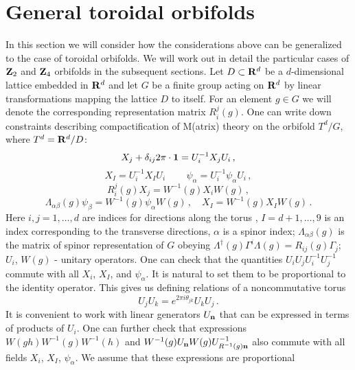 \documentclass[a4paper,a4paper]{article}
\begin{document}
\section{General toroidal orbifolds}
In this section we will consider  how the considerations above can be generalized to the case of  toroidal orbifolds. 
We will work out in detail the particular cases of ${\bf Z}_{2}$ and ${\bf Z}_{4}$ orbifolds in the subsequent sections. 
Let $D\subset {\bf R}^{d}$ be a $d$-dimensional lattice  embedded in ${\bf R}^{d}$ and let $G$ be a finite 
group acting on   ${\bf R}^{d}$ by linear transformations mapping the lattice $D$ to itself. 
For an element $g\in G$ we will denote the corresponding representation matrix $R_{i}^{j}(g)$.
One can write down constraints describing compactification of M(atrix) theory on the orbifold $T^{d}/G$, 
where $T^{d}={\bf R}^{d}/D$: 
\begin{equation} \label{e1}
X_{j} + \delta_{ij}2\pi \cdot {\bf 1} = U_{i}^{-1}X_{j}U_{i} \, , 
\end{equation}
\begin{equation} \label{eq1'}
  X_{I} = U_{i}^{-1}X_{I}U_{i} \, \qquad \psi_{\alpha} = U_{i}^{-1}\psi_{\alpha}U_{i} \, ,
\end{equation}
\begin{equation} \label{e2}
R_{i}^{j}(g)X_{j} = W^{-1}(g)X_{i}W(g) \, , 
\end{equation}
\begin{equation} \label{eq2'}
 \Lambda_{\alpha \beta}(g)\psi_{\beta} = W^{-1}(g)\psi_{\alpha}W(g) \, , \quad X_{I} = W^{-1}(g) X_{I} W(g) \, . 
\end{equation}
Here  $i,j =1, \dots , d$ are indices for directions along the torus , $I= d+1,\dots , 9$ is an index corresponding to  the transverse 
directions, $\alpha$ is a spinor index; $\Lambda_{\alpha \beta}(g)$ is the matrix of spinor representation of $G$ obeying 
$\Lambda^{\dagger}(g)\Gamma^{i}\Lambda(g)=R_{ij}(g)\Gamma_{j}$; $ U_{i}$, $W(g)$ - unitary operators.  
One can check that the quantities $U_{i}U_{j}U_{i}^{-1}U_{j}^{-1}$ 
commute with all $X_{i}$, $X_{I}$, and $\psi_{\alpha}$. It is natural to set them to be proportional to the identity operator. 
This gives us defining relations of  a noncommutative torus
$$
U_{j}U_{k} = e^{2\pi i\theta_{jk}}U_{k}U_{j} \, .  
$$
It is convenient to work with linear generators $U_{\bf n}$ that can be expressed in terms of products of $U_{i}$.  
One can further check that expressions $W(gh)W^{-1}(g)W^{-1}(h)$ and $W^{-1}(g)U_{\bf n}W(g)U^{-1}_{R^{-1}(g){\bf n}}$
also commute with all  fields $X_{i}$, $X_{I}$, $\psi_{\alpha}$. We assume that these expressions are proportional 
\end{document}

